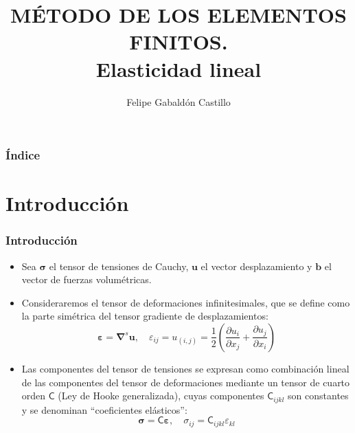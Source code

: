 \documentclass[handout]{beamer}
\title[Elasticidad lineal]{
MÉTODO DE LOS ELEMENTOS FINITOS. \\
Elasticidad lineal}
\author[F. Gabaldón]{Felipe Gabaldón Castillo}
\date{}
\begin{document}
\begin{frame}
\titlepage
\end{frame}
\begin{frame}
\frametitle{Índice}
\tableofcontents
\end{frame}
\section{Introducción}
\begin{frame}
\frametitle{Introducción}
\begin{itemize}
\item Sea $\bm{\sigma}$ el tensor de tensiones
de Cauchy, $\bm{u}$ el vector desplazamiento y $\bm{b}$ el vector de
fuerzas volumétricas.
\item Consideraremos el tensor de deformaciones infinitesimales, que se define
como la parte simétrica del tensor gradiente de desplazamientos:
\begin{equation}
\bm{\varepsilon}=\bm{\nabla}^s \bm{u}, \quad
\varepsilon_{ij}=u_{(i,j)}=\frac{1}{2}\left(
\frac{\partial u_i}{\partial x_j}+
\frac{\partial u_j}{\partial x_i}
\right)
\end{equation}
\item Las componentes del tensor de
tensiones se expresan como combinación lineal de las componentes del tensor
de deformaciones mediante un tensor de cuarto orden
$\boldsymbol{\mathsf{C}}$ (Ley de Hooke generalizada), cuyas
componentes $\mathsf{C}_{ijkl}$
son constantes y se denominan ``coeficientes elásticos'':
\begin{equation}
\bm{\sigma}= \boldsymbol{\mathsf{C}} \bm{\varepsilon} , \quad
\sigma_{ij}=\mathsf{C}_{ijkl} \varepsilon_{kl} \label{hookegen}
\end{equation}
\end{itemize}
\end{frame}
\end{document}
